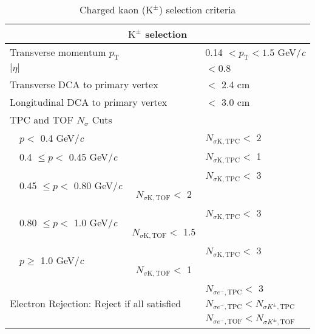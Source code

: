 \documentclass[ALICE,manyauthors]{cernphprep}
\newcommand{\Kpm}{$\mathrm{K^{\pm}}$\xspace}
\begin{document}
\begin{table}[htbp]
 \centering
 \caption{Charged kaon (\Kpm) selection criteria}
  \renewcommand{\arraystretch}{1.05}
  \begin{tabular}{lcc|c|l}
   \hline  
   \multicolumn{5}{c}{\textbf{\Kpm selection}} \\
   \hline
   \multicolumn{4}{l|}{Transverse momentum $p_{\mathrm{T}}$} & 0.14 $< p_{\mathrm{T}} < 1.5$ GeV/\textit{c} \\
   \hline
   \multicolumn{4}{l|}{$|\eta|$} & $< 0.8$ \\
   \hline
   \multicolumn{4}{l|}{Transverse DCA to primary vertex} & $<$ 2.4 cm \\
   \hline
   \multicolumn{4}{l|}{Longitudinal DCA to primary vertex} & $<$ 3.0 cm \\
   \hline

   \multicolumn{5}{l}{TPC and TOF $N_{\sigma}$ Cuts} \\
   \cline{2-5}
    & \multicolumn{2}{l}{$p <$ 0.4 GeV/\textit{c}} &  & $N_{\sigma \mathrm{K,TPC}} <$ 2 \\
   \cline{2-5}
    & \multicolumn{2}{l}{0.4 $\leq p <$ 0.45 GeV/\textit{c}} & & $N_{\sigma \mathrm{K,TPC}} <$ 1 \\
   \cline{2-5}     
    & \multicolumn{2}{l}{\multirow{2}{*}{0.45 $\leq p <$ 0.80 GeV/\textit{c}}} & & $N_{\sigma \mathrm{K,TPC}} <$ 3 \\ 
   \multicolumn{4}{c|}{} & $N_{\sigma \mathrm{K,TOF}} <$ 2 \\
   \cline{2-5}
    & \multicolumn{2}{l}{\multirow{2}{*}{0.80 $\leq p <$ 1.0 GeV/\textit{c}}} & & $N_{\sigma \mathrm{K,TPC}} <$ 3 \\
   \multicolumn{4}{c|}{} & $N_{\sigma \mathrm{K,TOF}} <$ 1.5 \\  
   \cline{2-5}
    & \multicolumn{2}{l}{\multirow{2}{*}{$p \geq$ 1.0 GeV/\textit{c}}} & & $N_{\sigma \mathrm{K,TPC}} <$ 3 \\
   \multicolumn{4}{c|}{} & $N_{\sigma \mathrm{K,TOF}} <$ 1 \\  
   \hline
   
   \multicolumn{4}{l|}{\multirow{3}{*}{Electron Rejection: Reject if all satisfied}} & $N_{\sigma e^{-},\mathrm{TPC}} < $ 3 \\
   \multicolumn{4}{c|}{} & $N_{\sigma e^{-},\mathrm{TPC}} < N_{\sigma K^{\pm},\mathrm{TPC}}$ \\
   \multicolumn{4}{c|}{} & $N_{\sigma e^{-},\mathrm{TOF}} < N_{\sigma K^{\pm},\mathrm{TOF}}$ \\
   \hline
   

\end{tabular}
\end{table}
\end{document}

